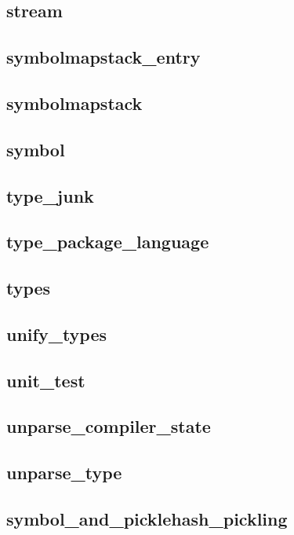 \subsection{stream}						
\subsection{symbolmapstack\_entry}				
\subsection{symbolmapstack}					
\subsection{symbol}						
\subsection{type\_junk}						
\subsection{type\_package\_language}				
\subsection{types}						
\subsection{unify\_types}					
\subsection{unit\_test}						
\subsection{unparse\_compiler\_state}				
\subsection{unparse\_type}					
\subsection{symbol\_and\_picklehash\_pickling}			
